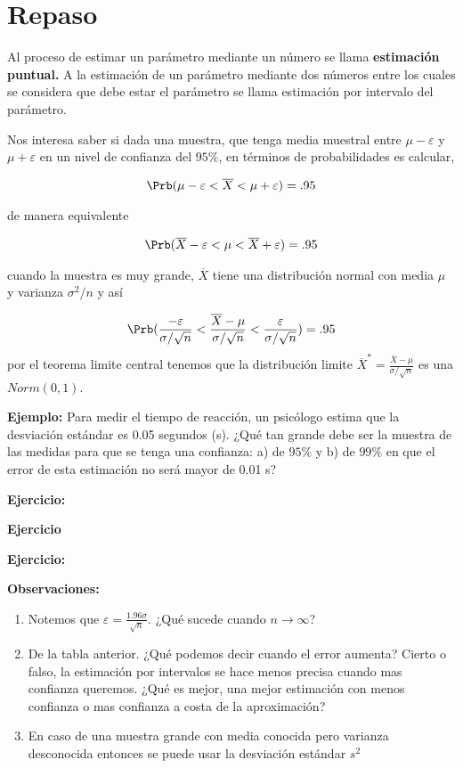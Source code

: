 \documentclass{assignment}
\begin{document}
\section{Repaso}

Al proceso de estimar un parámetro mediante un número se llama \textbf{estimación puntual.} A la estimación de un parámetro mediante dos números entre los cuales se considera que debe estar el parámetro se llama estimación por intervalo del parámetro. 


Nos interesa saber si dada una muestra, que tenga media muestral entre $\mu - \varepsilon$ y $\mu + \varepsilon$ en un nivel de confianza del $95\%$, en términos de probabilidades es calcular,

\begin{align*}
   \Prb( \mu - \varepsilon < \overline{X} < \mu  +\varepsilon) = .95
\end{align*}

de manera equivalente

\begin{align*}
   \Prb( \overline{X} - \varepsilon < \mu < \overline{X} +\varepsilon) = .95
\end{align*}

cuando la muestra es muy grande, $\overline{X}$ tiene una distribución normal con media $\mu$ y varianza $\sigma^2/n$ y así 

\begin{align*}
   \Prb( \frac{- \varepsilon }{\sigma/\sqrt{n}} < \frac{\overline{X} - \mu }{\sigma/\sqrt{n}}  < \frac{\varepsilon }{\sigma/\sqrt{n}}) = .95
\end{align*}
por el teorema limite central tenemos que la distribución limite  $\overline{X}^*=\frac{\overline{X} - \mu }{\sigma/\sqrt{n}}$ es una $Norm(0,1)$.

\textbf{Ejemplo:}
Para medir el tiempo de reacción, un psicólogo estima que la desviación estándar es 0.05 segundos (s). ¿Qué
tan grande debe ser la muestra de las medidas para que se tenga una confianza: a) de $95\%$ y b) de $99\%$ en que el error de esta estimación no será mayor de 0.01 s?


\textbf{Ejercicio:}




\textbf{Ejercicio}


\textbf{Ejercicio:}



\textbf{Observaciones:}
\begin{enumerate}
    \item Notemos que $\varepsilon = \frac{1.96 \sigma}{\sqrt{n}}$. ¿Qué sucede cuando $n \to \infty$?
    \item De la tabla anterior. ¿Qué podemos decir cuando el error aumenta? Cierto o falso, la estimación por intervalos se hace menos precisa cuando mas confianza queremos. ¿Qué es mejor, una mejor estimación con menos confianza o mas confianza a costa de la aproximación?
    \item En caso de una muestra grande con media conocida pero varianza desconocida entonces se puede usar la desviación estándar $s^2$
\end{enumerate}
\end{document}
